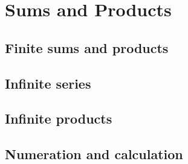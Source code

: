 \chapter{Sums and Products}
\section{Finite sums and products}
\section{Infinite series}
\section{Infinite products}
\section{Numeration and calculation}

